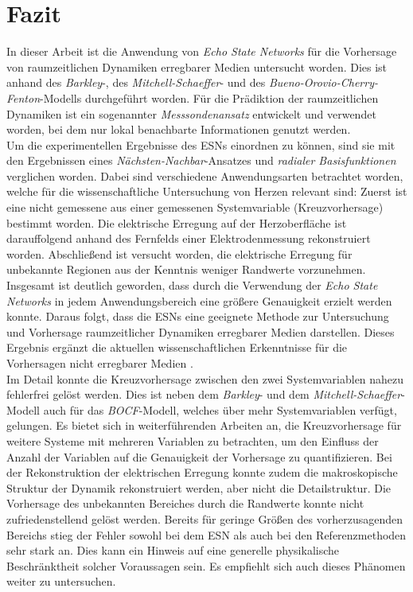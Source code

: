\chapter{Fazit}
In dieser Arbeit ist die Anwendung von \textit{Echo State Networks} für die Vorhersage von raumzeitlichen Dynamiken erregbarer Medien untersucht worden. Dies ist anhand des \textit{Barkley}-, des \textit{Mitchell-Schaeffer}- und des \textit{Bueno-Orovio-Cherry-Fenton}-Modells durchgeführt worden. Für die Prädiktion der raumzeitlichen Dynamiken ist ein sogenannter \textit{Messsondenansatz} entwickelt und verwendet worden, bei dem nur lokal benachbarte Informationen genutzt werden.\\

Um die experimentellen Ergebnisse des \textsc{ESN}s einordnen zu können, sind sie mit den Ergebnissen eines \textit{Nächsten-Nachbar}-Ansatzes und \textit{radialer Basisfunktionen} verglichen worden. Dabei sind verschiedene Anwendungsarten betrachtet worden, welche für die wissenschaftliche Untersuchung von Herzen relevant sind: Zuerst ist eine nicht gemessene aus einer gemessenen Systemvariable (Kreuzvorhersage) bestimmt worden. Die elektrische Erregung auf der Herzoberfläche ist darauffolgend anhand des Fernfelds einer Elektrodenmessung rekonstruiert worden. Abschließend ist versucht worden, die elektrische Erregung für unbekannte Regionen aus der Kenntnis weniger Randwerte vorzunehmen.\\

Insgesamt ist deutlich geworden, dass durch die Verwendung der \textit{Echo State Networks} in jedem Anwendungsbereich eine größere Genauigkeit erzielt werden konnte. Daraus folgt, dass die \textsc{ESN}s eine geeignete Methode zur Untersuchung und Vorhersage raumzeitlicher Dynamiken erregbarer Medien darstellen. Dieses Ergebnis ergänzt die aktuellen wissenschaftlichen Erkenntnisse für die Vorhersagen nicht erregbarer Medien \citep{Lu2017}.\\

Im Detail konnte die Kreuzvorhersage zwischen den zwei Systemvariablen nahezu fehlerfrei gelöst werden. Dies ist neben dem \textit{Barkley}- und dem \textit{Mitchell-Schaeffer}-Modell auch für das \textit{BOCF}-Modell, welches über mehr Systemvariablen verfügt, gelungen. Es bietet sich in weiterführenden Arbeiten an, die Kreuzvorhersage für weitere Systeme mit mehreren Variablen zu betrachten, um den Einfluss der Anzahl der Variablen auf die Genauigkeit der Vorhersage zu quantifizieren. Bei der Rekonstruktion der elektrischen Erregung konnte zudem die makroskopische Struktur der Dynamik rekonstruiert werden, aber nicht die Detailstruktur. Die Vorhersage des unbekannten Bereiches durch die Randwerte konnte nicht zufriedenstellend gelöst werden. Bereits für geringe Größen des vorherzusagenden Bereichs stieg der Fehler sowohl bei dem \textsc{ESN} als auch bei den Referenzmethoden sehr stark an. Dies kann ein Hinweis auf eine generelle physikalische Beschränktheit solcher Voraussagen sein. Es empfiehlt sich auch dieses Phänomen weiter zu untersuchen. \\

